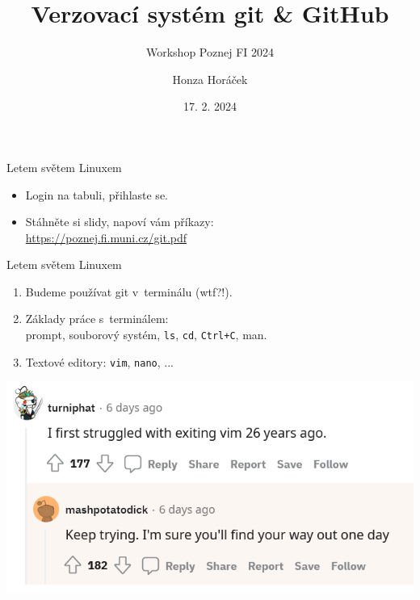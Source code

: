 \documentclass[
]{beamer}
\title{Verzovací systém git \& GitHub}
\subtitle{Workshop Poznej FI 2024}
\author[Honza Horáček]{Honza Horáček}
\institute[FI MU]{Spolek přátel severské zvěře, Fakulta informatiky, Masarykova univerzita}
\date{17. 2. 2024}
\begin{document}
\begin{frame}[plain]
\maketitle
\end{frame}


\begin{frame}{Letem světem Linuxem}
\begin{itemize}
	\item Login na tabuli, přihlaste se.
	\item Stáhněte si slidy, napoví vám příkazy: \\ \url{https://poznej.fi.muni.cz/git.pdf}
\end{itemize}
\end{frame}

\begin{frame}{Letem světem Linuxem}
\begin{enumerate}
	\item Budeme používat git v terminálu (wtf?!).
	\item Základy práce s terminálem: \\
	prompt, souborový systém, \texttt{ls}, \texttt{cd}, \texttt{Ctrl+C}, man.
	\pause
	\item Textové editory: \texttt{vim}, \texttt{nano}, ...
\end{enumerate}
\end{frame}


\begin{frame}
\includegraphics[width=\textwidth]{images/vim1.png}
\end{frame}
\end{document}
